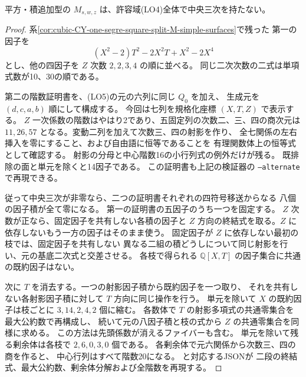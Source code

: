 \begin{theorem}\label{thm:cubic-CY-one-segre-square-split-M-empty}
平方・積追加型の $M_{s,w,z}$ は、許容域(LO4)全体で中央三次を持たない。
\end{theorem}
\begin{proof}
系\ref{cor:cubic-CY-one-segre-square-split-M-simple-surfaces}で残った
第一の因子を
\[
 (X^2-2)T^2-2X^2 T+X^2-2X^4
\]
とし、他の四因子を $Z$ 次数 $2,2,3,4$ の順に並べる。
同じ二次次数の二式は単項式数が10、30の順である。

第二の階数証明書を、(LO5)の元の六列に同じ $Q_0$ を加え、
生成元を $(d,c,a,b)$ 順にして構成する。
今回は七列を規格化座標 $(X,T,Z)$ で表示する。
$Z$ 一次係数の階数はやはり2であり、五固定列の次数二、三、四の商次元は
$11,26,57$ となる。変動二列を加えて次数三、四の射影を作り、
全七関係の左右挿入を零にすること、および自由語に恒等であることを
有理関数体上の恒等式として確認する。
射影の分母と中心階数16の小行列式の例外だけが残る。
既排除の面と単元を除くと14因子である。
この証明書も上記の検証器の \texttt{--alternate} で再現できる。

従って中央三次が非零なら、二つの証明書それぞれの四符号移送からなる
八個の因子積が全て零になる。
第一の証明書の五因子のうち一つを固定する。
$Z$ 次数が正なら、固定因子を共有しない各積の因子と
$Z$ 方向の終結式を取る。$Z$ に依存しないもう一方の因子はそのまま使う。
固定因子が $Z$ に依存しない最初の枝では、固定因子を共有しない
異なる二組の積どうしについて同じ射影を行い、元の基底二次式と交差させる。
各枝で得られる $\mathbb Q[X,T]$ の因子集合に共通の既約因子はない。

次に $T$ を消去する。一つの射影因子積から既約因子を一つ取り、
それを共有しない各射影因子積に対して $T$ 方向に同じ操作を行う。
単元を除いて $X$ の既約因子は枝ごとに $3,14,2,4,2$ 個に縮む。
各数体で $T$ の射影多項式の共通零集合を最大公約数で再構成し、
続いて元の八因子積と枝の式から $Z$ の共通零集合を同様に求める。
この方法は先頭係数が消えるファイバーも含む。
単元を除いて残る剰余体は各枝で $2,6,0,3,0$ 個である。
各剰余体で元六関係から次数三、四の商を作ると、
中心行列はすべて階数20になる。
 と対応するJSONが
二段の終結式、最大公約数、剰余体分解および全階数を再現する。
\end{proof}
